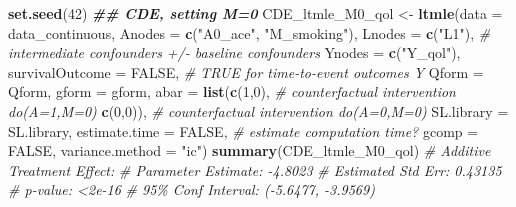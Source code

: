 \documentclass[
]{book}
\newenvironment{Shaded}{\begin{snugshade}}{\end{snugshade}}
\newcommand{\AttributeTok}[1]{\textcolor[rgb]{0.13,0.29,0.53}{#1}}
\newcommand{\CommentTok}[1]{\textcolor[rgb]{0.56,0.35,0.01}{\textit{#1}}}
\newcommand{\ConstantTok}[1]{\textcolor[rgb]{0.56,0.35,0.01}{#1}}
\newcommand{\DecValTok}[1]{\textcolor[rgb]{0.00,0.00,0.81}{#1}}
\newcommand{\DocumentationTok}[1]{\textcolor[rgb]{0.56,0.35,0.01}{\textbf{\textit{#1}}}}
\newcommand{\FunctionTok}[1]{\textcolor[rgb]{0.13,0.29,0.53}{\textbf{#1}}}
\newcommand{\NormalTok}[1]{#1}
\newcommand{\OtherTok}[1]{\textcolor[rgb]{0.56,0.35,0.01}{#1}}
\newcommand{\StringTok}[1]{\textcolor[rgb]{0.31,0.60,0.02}{#1}}
\begin{document}
\begin{Shaded}
\begin{Highlighting}[]
\FunctionTok{set.seed}\NormalTok{(}\DecValTok{42}\NormalTok{)}
\DocumentationTok{\#\# CDE, setting M=0}
\NormalTok{CDE\_ltmle\_M0\_qol }\OtherTok{\textless{}{-}} \FunctionTok{ltmle}\NormalTok{(}\AttributeTok{data =}\NormalTok{ data\_continuous,}
                      \AttributeTok{Anodes =} \FunctionTok{c}\NormalTok{(}\StringTok{"A0\_ace"}\NormalTok{, }\StringTok{"M\_smoking"}\NormalTok{),}
                      \AttributeTok{Lnodes =} \FunctionTok{c}\NormalTok{(}\StringTok{"L1"}\NormalTok{), }\CommentTok{\# intermediate confounders +/{-} baseline confounders}
                      \AttributeTok{Ynodes =} \FunctionTok{c}\NormalTok{(}\StringTok{"Y\_qol"}\NormalTok{),}
                      \AttributeTok{survivalOutcome =} \ConstantTok{FALSE}\NormalTok{, }\CommentTok{\# TRUE for time{-}to{-}event outcomes Y}
                      \AttributeTok{Qform =}\NormalTok{ Qform,}
                      \AttributeTok{gform =}\NormalTok{ gform,}
                      \AttributeTok{abar =} \FunctionTok{list}\NormalTok{(}\FunctionTok{c}\NormalTok{(}\DecValTok{1}\NormalTok{,}\DecValTok{0}\NormalTok{), }\CommentTok{\# counterfactual intervention do(A=1,M=0)}
                                  \FunctionTok{c}\NormalTok{(}\DecValTok{0}\NormalTok{,}\DecValTok{0}\NormalTok{)), }\CommentTok{\# counterfactual intervention do(A=0,M=0)}
                      \AttributeTok{SL.library =}\NormalTok{ SL.library,}
                      \AttributeTok{estimate.time =} \ConstantTok{FALSE}\NormalTok{, }\CommentTok{\# estimate computation time?}
                      \AttributeTok{gcomp =} \ConstantTok{FALSE}\NormalTok{,}
                      \AttributeTok{variance.method =} \StringTok{"ic"}\NormalTok{)}
\FunctionTok{summary}\NormalTok{(CDE\_ltmle\_M0\_qol)}
\CommentTok{\# Additive Treatment Effect:}
\CommentTok{\#   Parameter Estimate:  {-}4.8023}
\CommentTok{\#    Estimated Std Err:  0.43135}
\CommentTok{\#              p{-}value:  \textless{}2e{-}16}
\CommentTok{\#    95\% Conf Interval: ({-}5.6477, {-}3.9569)}


\end{Highlighting}
\end{Shaded}
\end{document}

